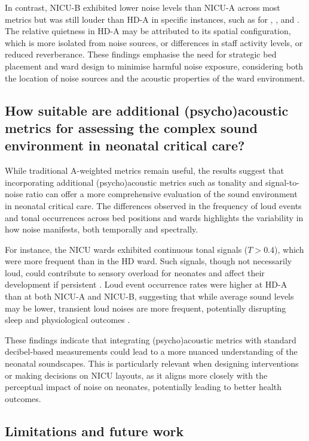 In contrast, NICU-B exhibited lower noise levels than NICU-A across most metrics but was still louder than HD-A in specific instances, such as for , , and . The relative quietness in HD-A may be attributed to its spatial configuration, which is more isolated from noise sources, or differences in staff activity levels, or reduced reverberance. These findings emphasise the need for strategic bed placement and ward design to minimise harmful noise exposure, considering both the location of noise sources and the acoustic properties of the ward environment.

\subsection{How suitable are additional (psycho)acoustic metrics for assessing the complex sound environment in
neonatal critical care?} \label{sec:rq3other}

While traditional A-weighted metrics remain useful, the results suggest that incorporating additional (psycho)acoustic metrics such as tonality and signal-to-noise ratio can offer a more comprehensive evaluation of the sound environment in neonatal critical care. The differences observed in the frequency of loud events and tonal occurrences across bed positions and wards highlights the variability in how noise manifests, both temporally and spectrally.

For instance, the NICU wards exhibited continuous tonal signals ($T>0.4$), which were more frequent than in the HD ward. Such signals, though not necessarily loud, could contribute to sensory overload for neonates and affect their development if persistent \citep{lejeune_sound_2016}. Loud event occurrence rates were higher at HD-A than at both NICU-A and NICU-B, suggesting that while average sound levels may be lower, transient loud noises are more frequent, potentially disrupting sleep and physiological outcomes \citep{kuhn_evaluating_2011}. 

These findings indicate that integrating (psycho)acoustic metrics with standard decibel-based measurements could lead to a more nuanced understanding of the neonatal soundscapes. This is particularly relevant when designing interventions or making decisions on NICU layouts, as it aligns more closely with the perceptual impact of noise on neonates, potentially leading to better health outcomes.

\subsection{Limitations and future work} \label{sec:limits}

